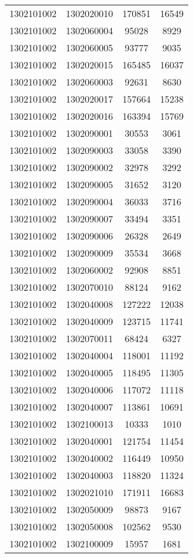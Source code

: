 \begin{longtable}{llcc}
1302101002 & 1302020010 & 170851 & 16549\\
1302101002 & 1302060004 & 95028 & 8929\\
1302101002 & 1302060005 & 93777 & 9035\\
1302101002 & 1302020015 & 165485 & 16037\\
1302101002 & 1302060003 & 92631 & 8630\\
1302101002 & 1302020017 & 157664 & 15238\\
1302101002 & 1302020016 & 163394 & 15769\\
1302101002 & 1302090001 & 30553 & 3061\\
1302101002 & 1302090003 & 33058 & 3390\\
1302101002 & 1302090002 & 32978 & 3292\\
1302101002 & 1302090005 & 31652 & 3120\\
1302101002 & 1302090004 & 36033 & 3716\\
1302101002 & 1302090007 & 33494 & 3351\\
1302101002 & 1302090006 & 26328 & 2649\\
1302101002 & 1302090009 & 35534 & 3668\\
1302101002 & 1302060002 & 92908 & 8851\\
1302101002 & 1302070010 & 88124 & 9162\\
1302101002 & 1302040008 & 127222 & 12038\\
1302101002 & 1302040009 & 123715 & 11741\\
1302101002 & 1302070011 & 68424 & 6327\\
1302101002 & 1302040004 & 118001 & 11192\\
1302101002 & 1302040005 & 118495 & 11305\\
1302101002 & 1302040006 & 117072 & 11118\\
1302101002 & 1302040007 & 113861 & 10691\\
1302101002 & 1302100013 & 10333 & 1010\\
1302101002 & 1302040001 & 121754 & 11454\\
1302101002 & 1302040002 & 116449 & 10950\\
1302101002 & 1302040003 & 118820 & 11324\\
1302101002 & 1302021010 & 171911 & 16683\\
1302101002 & 1302050009 & 98873 & 9167\\
1302101002 & 1302050008 & 102562 & 9530\\
1302101002 & 1302100009 & 15957 & 1681\\

\end{longtable}
